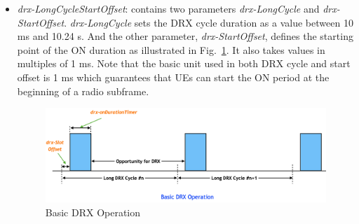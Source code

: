 \documentclass[]{IEEEtran}
\begin{document}
\begin{itemize}
    \item \textit{drx-LongCycleStartOffset}: contains two parameters \textit{drx-LongCycle} and \textit{drx-StartOffset}. 
 \textit{drx-LongCycle} sets the DRX cycle duration as a value between 10 ms and 10.24 s. 
    And the other parameter, \textit{drx-StartOffset}, defines the starting point of the ON duration as illustrated in Fig.~\ref{fig:basic-drx-operation}. It also takes values in multiples of 1 ms.
    Note that the basic unit used in both DRX cycle and start offset is 1 ms which guarantees that UEs can start the ON period at the beginning of a radio subframe.

\begin{figure}
    \centering
    \includegraphics[width=\linewidth]{Pictures/Basic DRX Operation.png}
    \caption{Basic DRX Operation}
    \label{fig:basic-drx-operation}
\end{figure}
    

\end{itemize}
\end{document}
